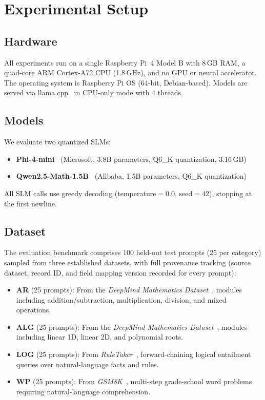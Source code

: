 \documentclass[journal]{IEEEtai}
\begin{document}
\section{Experimental Setup}
\label{sec:setup}

\subsection{Hardware}

All experiments run on a single Raspberry Pi~4 Model B with 8\,GB RAM, a quad-core ARM Cortex-A72 CPU (1.8\,GHz), and no GPU or neural accelerator. The operating system is Raspberry Pi OS (64-bit, Debian-based). Models are served via llama.cpp~\cite{llamacpp2023} in CPU-only mode with 4 threads.

\subsection{Models}

We evaluate two quantized SLMs:
\begin{itemize}
    \item \textbf{Phi-4-mini}~\cite{abdin2024phi4} (Microsoft, 3.8B parameters, Q6\_K quantization, 3.16\,GB)
    \item \textbf{Qwen2.5-Math-1.5B}~\cite{qwen2025} (Alibaba, 1.5B parameters, Q6\_K quantization)
\end{itemize}

All SLM calls use greedy decoding (temperature${}=0.0$, seed${}=42$), stopping at the first newline.

\subsection{Dataset}
\label{sec:dataset}

The evaluation benchmark comprises 100 held-out test prompts (25 per category) sampled from three established datasets, with full provenance tracking (source dataset, record ID, and field mapping version recorded for every prompt):
\begin{itemize}
    \item \textbf{AR} (25 prompts): From the \textit{DeepMind Mathematics Dataset}~\cite{saxton2019deepmind}, modules including addition/subtraction, multiplication, division, and mixed operations.
    \item \textbf{ALG} (25 prompts): From the \textit{DeepMind Mathematics Dataset}~\cite{saxton2019deepmind}, modules including linear 1D, linear 2D, and polynomial roots.
    \item \textbf{LOG} (25 prompts): From \textit{RuleTaker}~\cite{clark2020ruletaker}, forward-chaining logical entailment queries over natural-language facts and rules.
    \item \textbf{WP} (25 prompts): From \textit{GSM8K}~\cite{cobbe2021gsm8k}, multi-step grade-school word problems requiring natural-language comprehension.
\end{itemize}
\end{document}

